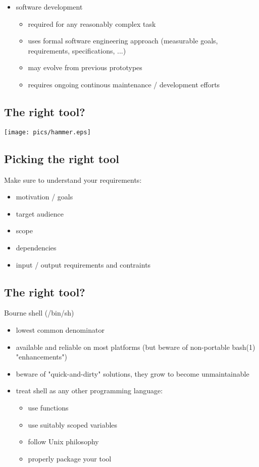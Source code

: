 \documentclass[xga]{xdvislides}
\begin{document}
\begin{itemize}
	\item software development
		\begin{itemize}
			\item required for any reasonably complex task
			\item uses formal software engineering approach (measurable goals,
				requirements, specifications, ...)
			\item may evolve from previous prototypes
			\item requires ongoing continous maintenance / development efforts
		\end{itemize}
\end{itemize}


\subsection{The right tool?}
\vspace*{\fill}
\begin{center}
	\texttt{[image: pics/hammer.eps]}
\end{center}
\vspace*{\fill}

\subsection{Picking the right tool}
Make sure to understand your requirements:

\begin{itemize}
	\item motivation / goals
	\item target audience
	\item scope
	\item dependencies
	\item input / output requirements and contraints
\end{itemize}


\subsection{The right tool?}
Bourne shell (/bin/sh) \\

\begin{itemize}
	\item lowest common denominator
	\item available and reliable on most platforms (but beware of non-portable
		bash(1) "enhancements")
	\item beware of "quick-and-dirty" solutions, they grow to become
		unmaintainable
	\item treat shell as any other programming language:
		\begin{itemize}
			\item use functions
			\item use suitably scoped variables
			\item follow Unix philosophy
			\item properly package your tool
		\end{itemize}
\end{itemize}
\end{document}
